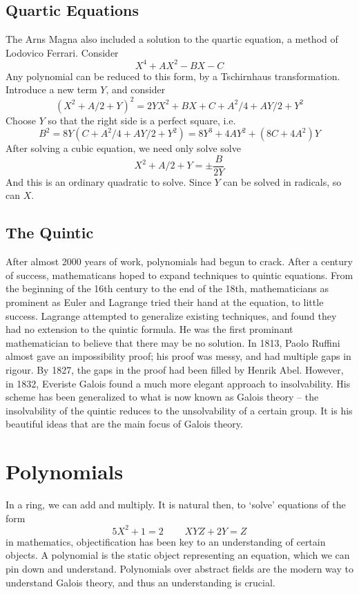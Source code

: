 \section{Quartic Equations}

The Arns Magna also included a solution to the quartic equation, a method of Lodovico Ferrari. Consider
%
\[ X^4 + AX^2 - BX - C \]
%
Any polynomial can be reduced to this form, by a Tschirnhaus transformation. Introduce a new term $Y$, and consider
%
\[ (X^2 + A/2 + Y)^2 = 2YX^2 + BX + C + A^2/4 + AY/2 + Y^2 \]
%
Choose $Y$ so that the right side is a perfect square, i.e.
%
\[ B^2 = 8Y(C + A^2/4 + AY/2 + Y^2) = 8Y^3 + 4AY^2 + (8C + 4A^2)Y \]
%
After solving a cubic equation, we need only solve solve
%
\[ X^2 + A/2 + Y = \pm \frac{B}{2Y} \]
%
And this is an ordinary quadratic to solve. Since $Y$ can be solved in radicals, so can $X$.

\section{The Quintic}

After almost 2000 years of work, polynomials had begun to crack. After a century of success, mathematicans hoped to expand techniques to quintic equations. From the beginning of the 16th century to the end of the 18th, mathematicians as prominent as Euler and Lagrange tried their hand at the equation, to little success. Lagrange attempted to generalize existing techniques, and found they had no extension to the quintic formula. He was the first prominant mathematician to believe that there may be no solution. In 1813, Paolo Ruffini almost gave an impossibility proof; his proof was messy, and had multiple gaps in rigour. By 1827, the gaps in the proof had been filled by Henrik Abel. However, in 1832, Everiste Galois found a much more elegant approach to insolvability. His scheme has been generalized to what is now known as Galois theory -- the insolvability of the quintic reduces to the unsolvability of a certain group. It is his beautiful ideas that are the main focus of Galois theory.









\chapter{Polynomials}

In a ring, we can add and multiply. It is natural then, to `solve' equations of the form
%
\[ 5 X^2 + 1 = 2\ \ \ \ \ \ \ \ \ \ XYZ + 2Y = Z \]
%
in mathematics, objectification has been key to an understanding of certain objects. A polynomial is the static object representing an equation, which we can pin down and understand. Polynomials over abstract fields are the modern way to understand Galois theory, and thus an understanding is crucial.

